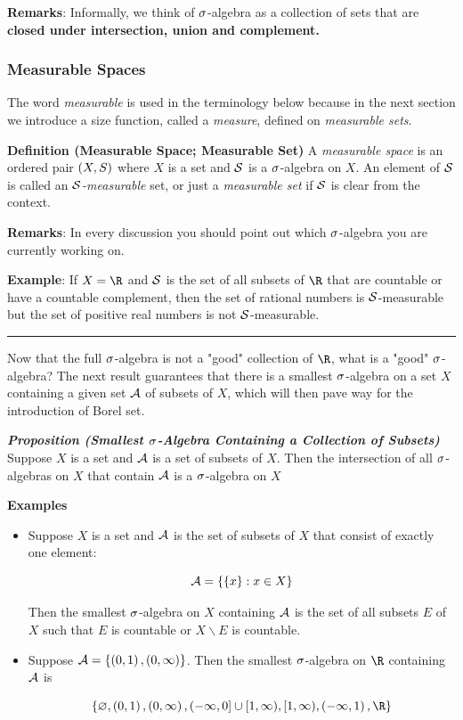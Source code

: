\documentclass[
]{article}
\begin{document}
\textbf{Remarks}: Informally, we think of \(\s\)-algebra as a collection
of sets that are \textbf{closed under intersection, union and
complement.}

\hypertarget{measurable-spaces}{%
\subsubsection{Measurable Spaces}\label{measurable-spaces}}

The word \emph{measurable} is used in the terminology below because in
the next section we introduce a size function, called a \emph{measure},
defined on \emph{measurable sets}.

\textbf{Definition (Measurable Space; Measurable Set)} A
\emph{measurable space} is an ordered pair \(\pr{X,S}\) where \(X\) is a
set and \(\S\) is a \(\s\)-algebra on \(X\). An element of \(\S\) is
called an \emph{\(\S\)-measurable} set, or just a \emph{measurable set}
if \(\S\) is clear from the context.

\textbf{Remarks}: In every discussion you should point out which
\(\s\)-algebra you are currently working on.

\textbf{Example}: If \(X = \R\) and \(\S\) is the set of all subsets of
\(\R\) that are countable or have a countable complement, then the set
of rational numbers is \(\S\)-measurable but the set of positive real
numbers is not \(\S\)-measurable.

\begin{center}\rule{0.5\linewidth}{0.5pt}\end{center}

Now that the full \(\s\)-algebra is not a "good" collection of \(\R\),
what is a "good" \(\s\)-algebra? The next result guarantees that there
is a smallest \(\s\)-algebra on a set \(X\) containing a given set
\(\A\) of subsets of \(X\), which will then pave way for the
introduction of Borel set.

\emph{\textbf{Proposition (Smallest \(\s\)-Algebra Containing a
Collection of Subsets)}} Suppose \(X\) is a set and \(\A\) is a set of
subsets of \(X\). Then the intersection of all \(\s\)-algebras on \(X\)
that contain \(\A\) is a \(\s\)-algebra on \(X\)

\textbf{Examples}

\begin{itemize}
\item
  Suppose \(X\) is a set and \(\A\) is the set of subsets of \(X\) that
  consist of exactly one element:

  \[\A = \brace{\brace{x}:x\in X}\]

  Then the smallest \(\s\)-algebra on \(X\) containing \(\A\) is the set
  of all subsets \(E\) of \(X\) such that \(E\) is countable or
  \(X\backslash E\) is countable.
\item
  Suppose \(\A = \brace{\pr{0,1},\pr{0,\infty}}\). Then the smallest
  \(\s\)-algebra on \(\R\) containing \(\A\) is

  \[\brace{\empty,\pr{0,1},\pr{0,\infty},(-\infty,0]\cup [1,\infty),[1,\infty),\pr{-\infty,1},\R}\]
\end{itemize}
\end{document}
